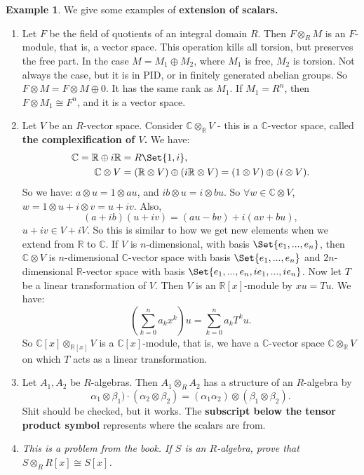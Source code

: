\documentclass[9pt,reqno,twoside]{amsbook}
\theoremstyle{plain}
\numberwithin{section}{chapter}
\numberwithin{equation}{chapter}
\theoremstyle{definition}
\newtheorem{Ex}[theorem]{Example}
\theoremstyle{remark}
\theoremstyle{plain}
\newcommand{\R}{\mathbb{R}}
\renewcommand{\c}{\mathbb{C}}
\newcommand{\bee}{\begin{equation}\begin{aligned}}
\newcommand{\eee}{\end{aligned}\end{equation}}
\newcommand{\tens}{\otimes}
\begin{document}
\begin{Ex}
We give some examples of \textbf{extension of scalars. }

\begin{enumerate}
\item Let $F$ be the field of quotients of an integral domain $R$. Then $F \tens_R M$ is an $F$-module, that is, a vector space. This operation kills all torsion, but preserves the free part. In the case $M = M_1 \oplus M_2$, where $M_1$ is free, $M_2$ is torsion. Not always the case, but it is in PID, or in finitely generated abelian groups. So $F \tens M = F \tens M \oplus 0$. It has the same rank as $M_1$. If $M_1 = R^n$, then $F \tens M_1 \cong F^n$, and it is a vector space. 

\item Let $V$ be an $R$-vector space. Consider $\c \tens_\R V$ - this is a $\c$-vector space, called \textbf{the complexification of $V$.} We have: 
\bee
\c = \R \oplus i\R &= R \Set{1,i},\\
\c \tens V &= (\R \tens V) \oplus (i\R \tens V) = (1 \tens V) \oplus (i \tens V).
\eee
So we have: $a \tens u = 1 \tens au$, and $ib \tens u = i \tens bu$. So $\forall w \in \c \tens V$, $w = 1 \tens u + i \tens v = u + iv$. Also, 
$$
(a + ib)(u + iv) = (au - bv) + i(av + bu),
$$
$u + iv \in V + iV$. So this is similar to how we get new elements when we extend from $\R$ to $\c$. If $V$ is $n$-dimensional, with basis $\Set{e_1,...,e_n}$, then $\c \tens V$ is $n$-dimensional $\c$-vector space with basis $\Set{e_1,...,e_n}$ and $2n$-dimensional $\R$-vector space with basis $\Set{e_1,...,e_n,ie_1,...,ie_n}$. Now let $T$ be a linear transformation of $V$. Then $V$ is an $\R[x]$-module by $xu = Tu$. We have: 
$$
\left( \sum_{k = 0}^n a_k x^k\right) u = \sum_{k = 0}^n a_kT^ku.
$$
So $\c[x] \tens_{\R[x]} V$ is a $\c[x]$-module, that is, we have a $\c$-vector space $\c \tens_\R V$ on which $T$ acts as a linear transformation. 

\item Let $A_1,A_2$ be $R$-algebras. Then $A_1 \tens_R A_2$ has a structure of an $R$-algebra by 
$$
\alpha_1 \tens \beta_1) \cdot (\alpha_2 \tens \beta_2) = (\alpha_1\alpha_2)\tens(\beta_1\tens \beta_2).
$$
Shit should be checked, but it works. The \textbf{subscript below the tensor product symbol} represents where the scalars are from. 

\item \textit{This is a problem from the book. If $S$ is an $R$-algebra, prove that $S \tens_R R[x] \cong S[x]$. }


\end{enumerate}
\end{Ex}
\end{document}
